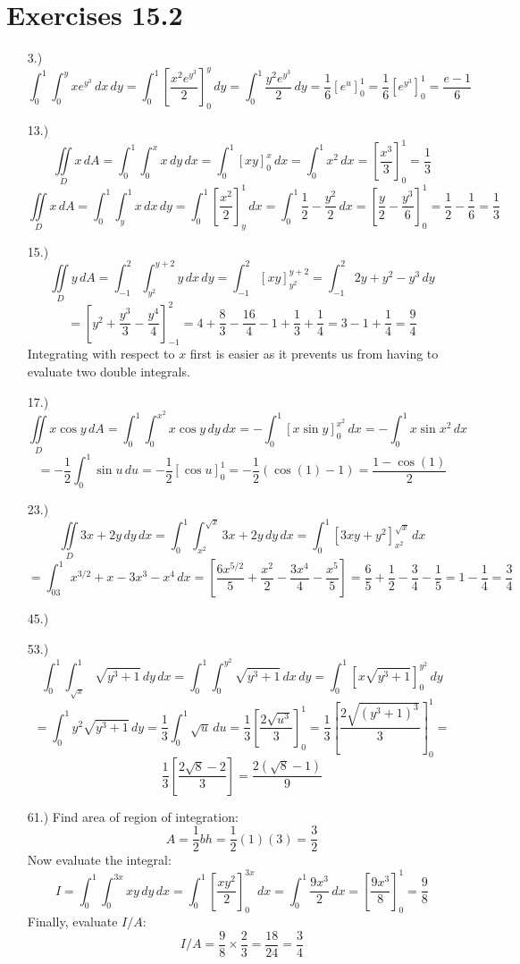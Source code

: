 \documentclass[12pt]{article}
\newcommand{\bracks}[1]{\left[#1\right]}
\newcommand{\parns}[1]{\left(#1\right)}
\begin{document}
\section*{Exercises 15.2}
\begin{itemize}
    \item [3.)] \[\int^1_0\int^y_0xe^{y^3}\,dx\,dy=\int^1_0\bracks{\frac{x^2e^{y^3}}{2}}^y_0\,dy=\int^1_0\frac{y^2e^{y^3}}{2}\,dy=\frac{1}{6}\bracks{e^u}^1_0=\frac{1}{6}\bracks{e^{y^3}}^1_0=\frac{e-1}{6}\]

    \item [13.)] \[\iint\limits_Dx\,dA=\int^1_0\int^x_0x\,dy\,dx=\int^1_0\bracks{xy}^x_0\,dx=\int^1_0x^2\,dx=\bracks{\frac{x^3}{3}}^1_0=\frac{1}{3}\]
    \[\iint\limits_Dx\,dA=\int^1_0\int^1_yx\,dx\,dy=\int^1_0\bracks{\frac{x^2}{2}}^1_y\,dx=\int^1_0\frac{1}{2}-\frac{y^2}{2}\,dx=\bracks{\frac{y}{2}-\frac{y^3}{6}}^1_0=\frac{1}{2}-\frac{1}{6}=\frac{1}{3}\]

    \item [15.)] \[\iint\limits_Dy\,dA=\int^2_{-1}\int_{y^2}^{y+2}y\,dx\,dy=\int^2_{-1}\bracks{xy}^{y+2}_{y^2}=\int^2_{-1}2y+y^2-y^3\,dy\]
    \[=\bracks{y^2+\frac{y^3}{3}-\frac{y^4}{4}}^2_{-1}=4+\frac{8}{3}-\frac{16}{4}-1+\frac{1}{3}+\frac{1}{4}=3-1+\frac{1}{4}=\frac{9}{4}\]
    Integrating with respect to $x$ first is easier as it prevents us from having to evaluate two double integrals.

    \item [17.)] \[\iint\limits_Dx\cos y\,dA=\int^1_0\int^{x^2}_0x\cos y\,dy\,dx=-\int^1_0\bracks{x\sin y}^{x^2}_0\,dx=-\int^1_0x\sin x^2\,dx\]
    \[=-\frac{1}{2}\int^1_0\sin u\,du=-\frac{1}{2}\bracks{\cos u}^1_0=-\frac{1}{2}(\cos(1)-1)=\frac{1-\cos(1)}{2}\]

    \item [23.)] \[\iint\limits_D3x+2y\,dy\,dx=\int^1_0\int^{\sqrt x}_{x^2}3x+2y\,dy\,dx=\int^1_0\bracks{3xy+y^2}^{\sqrt x}_{x^2}\,dx\]\[=\int^1_03x^{3/2}+x-3x^3-x^4\,dx=\bracks{\frac{6x^{5/2}}{5}+\frac{x^2}{2}-\frac{3x^4}{4}-\frac{x^5}{5}}=\frac{6}{5}+\frac{1}{2}-\frac{3}{4}-\frac{1}{5}=1-\frac{1}{4}=\frac{3}{4}\]

    \pagebreak
    \item [45.)] 

    \item [53.)] \[\int^1_0\int^1_{\sqrt x}\sqrt{y^3+1}\,dy\,dx=\int^1_0\int^{y^2}_0\sqrt{y^3+1}\,dx\,dy=\int^1_0\bracks{x\sqrt{y^3+1}}^{y^2}_0\,dy\]
    \[=\int^1_0y^2\sqrt{y^3+1}\,dy=\frac{1}{3}\int^1_0\sqrt{u}\,du=\frac{1}{3}\bracks{\frac{2\sqrt{u^3}}{3}}^1_0=\frac{1}{3}\bracks{\frac{2\sqrt{\parns{y^3+1}^3}}{3}}^1_0=\]
    \[\frac{1}{3}\bracks{\frac{2\sqrt8-2}{3}}=\frac{2\parns{\sqrt8-1}}{9}\]

    \item [61.)] Find area of region of integration:
    \[A=\frac{1}{2}bh=\frac{1}{2}(1)(3)=\frac{3}{2}\]
    Now evaluate the integral:
    \[I=\int^1_0\int^{3x}_0xy\,dy\,dx=\int^1_0\bracks{\frac{xy^2}{2}}^{3x}_0\,dx=\int^1_0\frac{9x^3}{2}\,dx=\bracks{\frac{9x^3}{8}}^1_0=\frac{9}{8}\]
    Finally, evaluate $I/A$:
    \[I/A=\frac{9}{8}\times\frac{2}{3}=\frac{18}{24}=\frac{3}{4}\]

\end{itemize}
\end{document}
